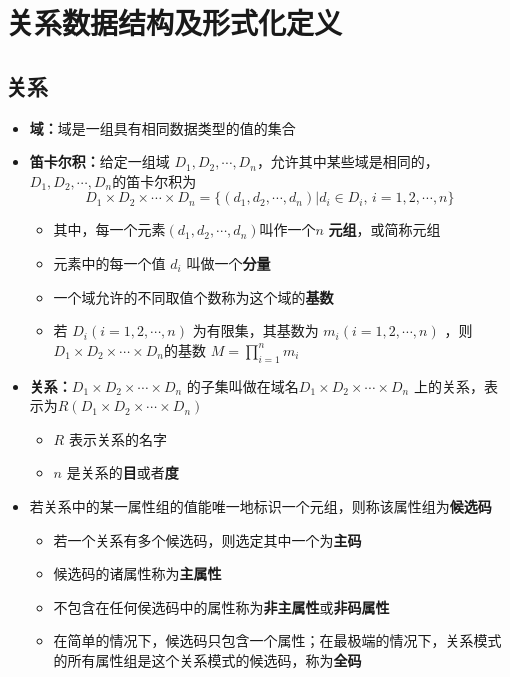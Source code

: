 \section{关系数据结构及形式化定义}

\subsection{关系}
\begin{itemize}
    \item \textbf{域：}域是一组具有相同数据类型的值的集合
    \item \textbf{笛卡尔积：}给定一组域 $D_1,D_2,\cdots, D_n$，允许其中某些域是相同的，$D_1,D_2,\cdots, D_n$​的笛卡尔积为
    $$D_1\times D_2\times \cdots \times D_n=\{(d_1,d_2,\cdots,d_n) | d_i\in D_i, \,  i= 1,2,\cdots ,n\}$$
    \begin{itemize}
        \item 其中，每一个元素$(d_1,d_2,\cdots,d_n)$叫作一个$n$ \textbf{元组}，或简称元组
        \item 元素中的每一个值 $d_i$ 叫做一个\textbf{分量}
        \item 一个域允许的不同取值个数称为这个域的\textbf{基数}
        \item 若 $D_i(i=1,2,\cdots,n)$ 为有限集，其基数为 $m_i(i=1,2,\cdots, n)$ ，则$D_1\times D_2\times \cdots \times D_n$的基数 $M=\displaystyle{\prod_{i=1}^n}m_i$
    \end{itemize}
    \item \textbf{关系：}$D_1\times D_2\times \cdots \times D_n$ 的子集叫做在域名$D_1\times D_2\times \cdots \times D_n$ 上的关系，表示为$R(D_1\times D_2\times \cdots \times D_n)$ 
    \begin{itemize}
        \item $R$ 表示关系的名字
        \item $n$ 是关系的\textbf{目}或者\textbf{度}
    \end{itemize}
    \item 若关系中的某一属性组的值能唯一地标识一个元组，则称该属性组为\textbf{候选码}
    \begin{itemize}
        \item 若一个关系有多个候选码，则选定其中一个为\textbf{主码}
        \item 候选码的诸属性称为\textbf{主属性}
        \item 不包含在任何侯选码中的属性称为\textbf{非主属性}或\textbf{非码属性}
        \item 在简单的情况下，候选码只包含一个属性；在最极端的情况下，关系模式的所有属性组是这个关系模式的候选码，称为\textbf{全码}

\end{itemize}
\end{itemize}
